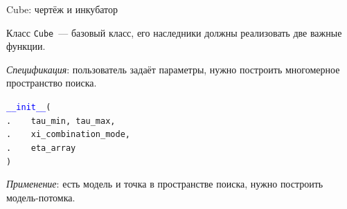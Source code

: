 \begin{frame}[t]{Cube: чертёж и инкубатор}

Класс \texttt{Cube}~--- базовый класс, его наследники должны реализовать две важные функции.

\textit{Спецификация}: пользователь задаёт параметры, нужно построить многомерное пространство поиска.

\begin{minipage}{0.39\textwidth}
{\small \texttt{\textcolor{blue}{\_\_init\_\_}(\\
.\ \ \ \ tau\_min,\ tau\_max,\\ 
.\ \ \ \ xi\_combination\_mode,\\
.\ \ \ \ eta\_array\\
)}}
\end{minipage}
\begin{minipage}{0.05\textwidth}
\scalebox{2}{$\rightarrow$}
\end{minipage}
\begin{minipage}{0.45\textwidth}
\end{minipage}
  

\textit{Применение}: есть модель и точка в пространстве поиска, нужно построить модель-потомка.


\end{frame}

